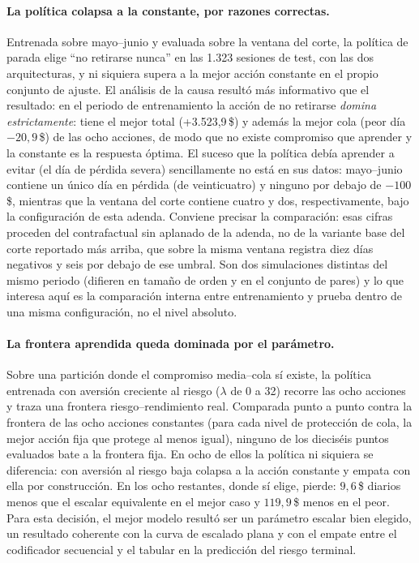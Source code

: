 \paragraph{La política colapsa a la constante, por razones correctas.} Entrenada sobre
mayo--junio y evaluada sobre la ventana del corte, la política de parada elige ``no
retirarse nunca'' en las 1.323 sesiones de test, con las dos arquitecturas, y ni siquiera
supera a la mejor acción constante en el propio conjunto de ajuste. El análisis de la
causa resultó más informativo que el resultado: en el periodo de entrenamiento la acción
de no retirarse \emph{domina estrictamente}: tiene el mejor total (+3.523,9\,\$) y además
la mejor cola (peor día $-20{,}9$\,\$) de las ocho acciones, de modo que no existe compromiso que
aprender y la constante es la respuesta óptima. El suceso que la política debía aprender a
evitar (el día de pérdida severa) sencillamente no está en sus datos: mayo--junio contiene
un único día en pérdida (de veinticuatro) y ninguno por debajo de $-100$\,\$, mientras que
la ventana del corte contiene cuatro y dos, respectivamente, bajo la configuración de
esta adenda. Conviene precisar la comparación: esas cifras proceden del contrafactual sin
aplanado de la adenda, no de la variante base del corte reportado más arriba, que sobre la
misma ventana registra diez días negativos y seis por debajo de ese umbral. Son dos
simulaciones distintas del mismo periodo (difieren en tamaño de orden y en el conjunto de
pares) y lo que interesa aquí es la comparación interna entre entrenamiento y prueba
dentro de una misma configuración, no el nivel absoluto.

\paragraph{La frontera aprendida queda dominada por el parámetro.} Sobre una partición
donde el compromiso media--cola sí existe, la política entrenada con aversión creciente al
riesgo ($\lambda$ de 0 a 32) recorre las ocho acciones y traza una frontera
riesgo--rendimiento real. Comparada punto a punto contra la frontera de las ocho acciones
constantes (para cada nivel de protección de cola, la mejor acción fija que protege al
menos igual), ninguno de los dieciséis puntos evaluados bate a la
frontera fija. En ocho de ellos la política ni siquiera se diferencia: con aversión al
riesgo baja colapsa a la acción constante y empata con ella por construcción. En los ocho
restantes, donde sí elige, pierde: $9{,}6$\,\$ diarios menos que el escalar equivalente en
el mejor caso y $119{,}9$\,\$ menos en el peor. Para esta decisión, el mejor modelo resultó ser un parámetro escalar
bien elegido, un resultado coherente con la curva de escalado plana y con el empate entre
el codificador secuencial y el tabular en la predicción del riesgo terminal.

